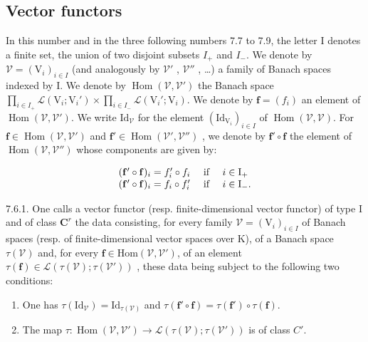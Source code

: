 \subsection{Vector functors}

In this number and in the three following numbers 7.7 to 7.9, the letter I denotes a finite set, the union of two disjoint subsets \(I_+\) and \(I_-\). We denote by \(\mathcal{V} = (\mathrm{V}_{i})_{i\in I}\) (and analogously by \(\mathcal{V}'\) , \(\mathcal{V}''\) , \ldots) a family of Banach spaces indexed by I. We denote by \(\operatorname{Hom}(\mathcal{V},\mathcal{V}')\) the Banach space \(\prod_{i\in I_+}\mathcal{L}(\mathrm{V}_i;\mathrm{V}_i')\times \prod_{i\in I_-}\mathcal{L}(\mathrm{V}_i';\mathrm{V}_i)\). We denote by \(\mathbf{f} = (f_i)\) an element of \(\operatorname{Hom}(\mathcal{V},\mathcal{V}')\). We write \(\mathrm{Id}_{\mathcal{V}}\) for the element \((\mathrm{Id}_{\mathrm{V}_i})_{i\in I}\) of \(\operatorname{Hom}(\mathcal{V},\mathcal{V})\). For \(\mathbf{f}\in \operatorname{Hom}(\mathcal{V},\mathcal{V}')\) and \(\mathbf{f}'\in \operatorname{Hom}(\mathcal{V}',\mathcal{V}'')\) , we denote by \(\mathbf{f}'\circ \mathbf{f}\) the element of \(\operatorname{Hom}(\mathcal{V},\mathcal{V}'')\) whose components are given by:

\[
\begin{array}{l l} (\mathbf {f} ^ {\prime} \circ \mathbf {f}) _ {i} = f _ {i} ^ {\prime} \circ f _ {i} & \text { if } \quad i \in \mathrm{I} _ {+} \\ (\mathbf {f} ^ {\prime} \circ \mathbf {f}) _ {i} = f _ {i} \circ f _ {i} ^ {\prime} & \text { if } \quad i \in \mathrm{I} _ {-}. \end{array}
\]

7.6.1. One calls a vector functor (resp. finite-dimensional vector functor) of type I and of class \(\mathbf{C}^r\) the data consisting, for every family \(\mathcal{V} = (\mathrm{V}_i)_{i\in I}\) of Banach spaces (resp. of finite-dimensional vector spaces over K), of a Banach space \(\tau(\mathcal{V})\) and, for every \(\mathbf{f}\in\mathrm{Hom}(\mathcal{V},\mathcal{V}')\), of an element \(\tau(\mathbf{f})\in\mathcal{L}(\tau(\mathcal{V});\tau(\mathcal{V}'))\) , these data being subject to the following two conditions:

\begin{enumerate}
\def\labelenumi{(\alph{enumi})}
\item
  One has \(\tau (\mathrm{Id}_{\mathcal{V}}) = \mathrm{Id}_{\tau (\mathcal{V})}\) and \(\tau (\mathbf{f}'\circ \mathbf{f}) = \tau (\mathbf{f}')\circ \tau (\mathbf{f}).\)
\item
  The map \(\tau : \operatorname{Hom}(\mathcal{V}, \mathcal{V}') \to \mathcal{L}(\tau(\mathcal{V}); \tau(\mathcal{V}'))\) is of class \(C'\).
\end{enumerate}

